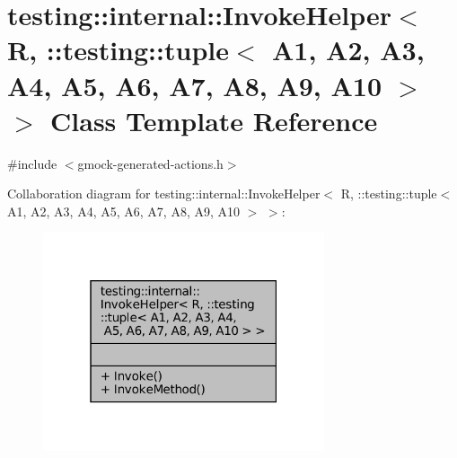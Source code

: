 \hypertarget{classtesting_1_1internal_1_1InvokeHelper_3_01R_00_01_1_1testing_1_1tuple_3_01A1_00_01A2_00_01A3_9a04af5e172e051ec3c8faaa2f50b42f}{}\section{testing\+:\+:internal\+:\+:Invoke\+Helper$<$ R, \+:\+:testing\+:\+:tuple$<$ A1, A2, A3, A4, A5, A6, A7, A8, A9, A10 $>$ $>$ Class Template Reference}
\label{classtesting_1_1internal_1_1InvokeHelper_3_01R_00_01_1_1testing_1_1tuple_3_01A1_00_01A2_00_01A3_9a04af5e172e051ec3c8faaa2f50b42f}


{\ttfamily \#include $<$gmock-\/generated-\/actions.\+h$>$}



Collaboration diagram for testing\+:\+:internal\+:\+:Invoke\+Helper$<$ R, \+:\+:testing\+:\+:tuple$<$ A1, A2, A3, A4, A5, A6, A7, A8, A9, A10 $>$ $>$\+:
\nopagebreak
\begin{figure}[H]
\begin{center}
\leavevmode
\includegraphics[width=235pt]{classtesting_1_1internal_1_1InvokeHelper_3_01R_00_01_1_1testing_1_1tuple_3_01A1_00_01A2_00_01A3_8211b52f08025af2e812e274f6042c93}
\end{center}
\end{figure}
